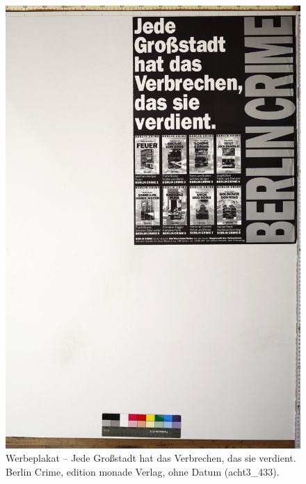 \documentclass[a4paper,12pt,ngerman]{article}
\begin{document}
\newpage
\begin{figure}[ht]
\includegraphics[width=\linewidth]{Abbildung_42_(acht3_433)}
\centering
\caption{Werbeplakat -- Jede Großstadt hat das Verbrechen, das sie verdient. Berlin Crime, edition monade Verlag, ohne Datum (acht3\_433).}
\end{figure}
\end{document}

